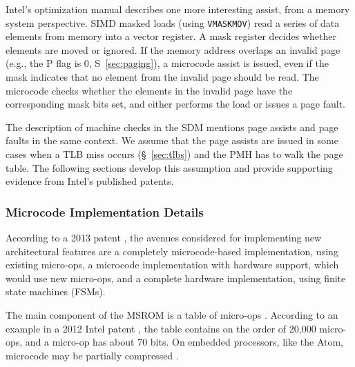 
Intel's optimization manual describes one more interesting assist, from a
memory system perspective. SIMD masked loads (using \texttt{VMASKMOV}) read a
series of data elements from memory into a vector register. A mask register
decides whether elements are moved or ignored. If the memory address overlaps
an invalid page (e.g., the P flag is 0, S~\ref{sec:paging}), a microcode assist
is issued, even if the mask indicates that no element from the invalid page
should be read. The microcode checks whether the elements in the invalid page
have the corresponding mask bits set, and either performs the load or issues a
page fault.


The description of machine checks in the SDM mentions page assists and page
faults in the same context. We assume that the page assists are issued in some
cases when a TLB miss occurs (\S~\ref{sec:tlbs}) and the PMH has to walk the
page table. The following sections develop this assumption and provide
supporting evidence from Intel's published patents.


\subsubsection{Microcode Implementation Details}


According to a 2013 patent \cite{intel2013scattergather}, the avenues
considered for implementing new architectural features are a completely
microcode-based implementation, using existing micro-ops, a microcode
implementation with hardware support, which would use new micro-ops, and a
complete hardware implementation, using finite state machines (FSMs).


The main component of the MSROM is a table of micro-ops \cite{intel2008genetic,
intel2012clusters}. According to an example in a 2012 Intel patent
\cite{intel2012clusters}, the table contains on the order of 20,000 micro-ops,
and a micro-op has about 70 bits. On embedded processors, like the Atom,
microcode may be partially compressed
\cite{intel2008genetic, intel2012clusters}.

